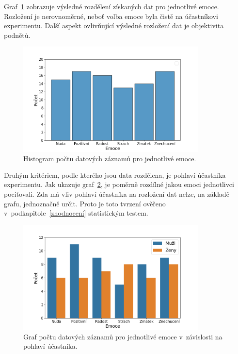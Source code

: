     Graf~\ref{fig:data_hist} zobrazuje výsledné rozdělení získaných dat pro jednotlivé emoce. Rozložení je nerovnoměrné, neboť volba emoce byla čistě na účastníkovi experimentu. Další aspekt ovlivňující výsledné rozložení dat je objektivita podnětů. 
    
     \begin{figure}[H]
        \centering
        \includegraphics[width=0.85\textwidth]{obrazky-figures/hist.png}
        \caption{Histogram počtu datových záznamů pro jednotlivé emoce.}
        \label{fig:data_hist}
    \end{figure}
    
    Druhým kritériem, podle kterého jsou data rozdělena, je pohlaví účastníka experimentu. Jak ukazuje graf~\ref{fig:data_emotion_count}, je poměrně rozdílné jakou emoci jednotlivci pociťovali. Zda má vliv pohlaví účastníka na rozložení dat nelze, na základě grafu, jednoznačně určit. Proto je toto tvrzení ověřeno v~podkapitole~\ref{zhodnoceni} statistickým testem.
    
   
    \begin{figure}[H]
        \centering
        \includegraphics[width=0.85\textwidth]{obrazky-figures/emotion_count.png}
        \caption{Graf počtu datových záznamů pro jednotlivé emoce v~závislosti na pohlaví účastníka.}
        \label{fig:data_emotion_count}
    \end{figure}
    
